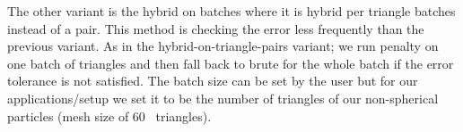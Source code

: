 The other variant is the hybrid on batches where it is hybrid per triangle batches instead of a pair. This method is checking the error less frequently than the previous variant. As in the hybrid-on-triangle-pairs variant; we run penalty on one batch of triangles and then fall back to brute for the whole batch if the error tolerance is not satisfied. The batch size can be set by the user but for our applications/setup we set it to be the number of triangles of our non-spherical particles (mesh size of 60~ triangles).    


